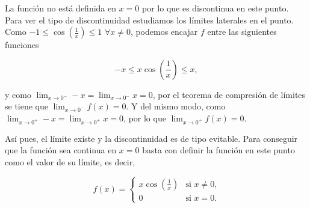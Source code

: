 \documentclass[
  spanish,
  a4paper,
]{scrreport}
\theoremstyle{definition}
\theoremstyle{remark}
\begin{document}
\begin{tcolorbox}[enhanced jigsaw, arc=.35mm, bottomrule=.15mm, bottomtitle=1mm, breakable, colback=white, colbacktitle=quarto-callout-tip-color!10!white, colframe=quarto-callout-tip-color-frame, coltitle=black, left=2mm, leftrule=.75mm, opacityback=0, opacitybacktitle=0.6, rightrule=.15mm, title=\textcolor{quarto-callout-tip-color}{\faLightbulb}\hspace{0.5em}{Solución}, titlerule=0mm, toprule=.15mm, toptitle=1mm]

La función no está definida en \(x=0\) por lo que es discontinua en este
punto. Para ver el tipo de discontinuidad estudiamos los límites
laterales en el punto. Como
\(-1\leq \cos\left(\frac{1}{x}\right)\leq 1\) \(\forall x\neq 0\),
podemos encajar \(f\) entre las siguientes funciones

\[
-x \leq x\cos\left(\frac{1}{x}\right) \leq x,
\]

y como \(\lim_{x\to 0^-} -x = \lim_{x\to 0^-} x=0\), por el teorema de
compresión de límites se tiene que \(\lim_{x\to 0^-} f(x) =0\). Y del
mismo modo, como \(\lim_{x\to 0^+} -x = \lim_{x\to 0^+} x=0\), por lo
que \(\lim_{x\to 0^+} f(x) =0\).

Así pues, el límite existe y la discontinuidad es de tipo evitable. Para
conseguir que la función sea continua en \(x=0\) basta con definir la
función en este punto como el valor de su límite, es decir,

\[
f(x) =
\begin{cases}
x\cos\left(\frac{1}{x}\right) & \mbox{si $x\neq 0$,}\\
0 & \mbox{si $x=0$.}
\end{cases}
\]

\end{tcolorbox}
\end{document}
